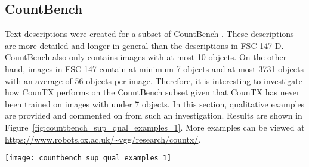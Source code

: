 \documentclass{bmvc2k}
\begin{document}
\newpage
\subsection{CountBench}
\label{sec:qual_countbench}
Text descriptions were created for a subset of CountBench \cite{paiss2023countclip}. These descriptions are more detailed and longer in general than the descriptions in FSC-147-D. CountBench also only contains images with at most 10 objects. On the other hand, images in FSC-147 \cite{m_Ranjan-etal-CVPR21} contain at minimum 7 objects and at most 3731 objects with an average of 56 objects per image. Therefore, it is interesting to investigate how CounTX performs on the CountBench subset given that CounTX has never been trained on images with under 7 objects. In this section, qualitative examples are provided and commented on from such an investigation. Results are shown in Figure~\ref{fig:countbench_sup_qual_examples_1}. More examples can be viewed at \\
\href{https://www.robots.ox.ac.uk/~vgg/research/countx/}{https://www.robots.ox.ac.uk/\textasciitilde vgg/research/countx/}.

\begin{figure*}[h!]
\begin{center}
\texttt{[image: countbench\_sup\_qual\_examples\_1]}
\end{center}
   \caption{Density maps produced by CounTX when applied to the CountBench \cite{paiss2023countclip} subset. Even though CounTX was never trained to count people, it can count the women in the leftmost image in the top row and the men in the third image in the third row. CounTX estimates that there are almost exactly 2 men in the third image in the third row, even though no image in FSC-147 \cite{m_Ranjan-etal-CVPR21}, the dataset CounTX was trained on, has under 7 objects. The class descriptions in FSC-147-D are very simple compared to the long and detailed description of the bell peppers in the third row. Despite this, CounTX provides a reasonable estimate for the count of the bell pepper halves given this long description.}
\label{fig:countbench_sup_qual_examples_1}
\end{figure*}
\end{document}
